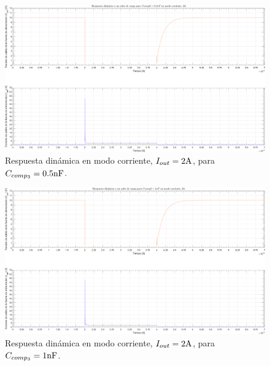 \clearpage

\begin{figure}[H] %
\begin{center}
\includegraphics[width=1.1 \textwidth, angle=90]{./img/plots/dynamic/power_supply_CCOMP3_0_5n_STEP_Modo3.png}
\caption{\label{fig:fig_power_supply_CCOMP3_STEP_0_5n_Modo3}\footnotesize{Respuesta dinámica en modo corriente, $I_{out} = 2 \si[per-mode=symbol]{\ampere}$, para $C_{comp_{3}} = 0.5 \si[per-mode=symbol]{\nano\farad} $.}}
\end{center}
\end{figure}

\clearpage

\begin{figure}[H] %
\begin{center}
\includegraphics[width=1.1 \textwidth, angle=90]{./img/plots/dynamic/power_supply_CCOMP3_1n_STEP_Modo3.png}
\caption{\label{fig:fig_power_supply_CCOMP3_STEP_1n_Modo3}\footnotesize{Respuesta dinámica en modo corriente, $I_{out} = 2 \si[per-mode=symbol]{\ampere}$, para $C_{comp_{3}} = 1 \si[per-mode=symbol]{\nano\farad} $.}}
\end{center}
\end{figure}

